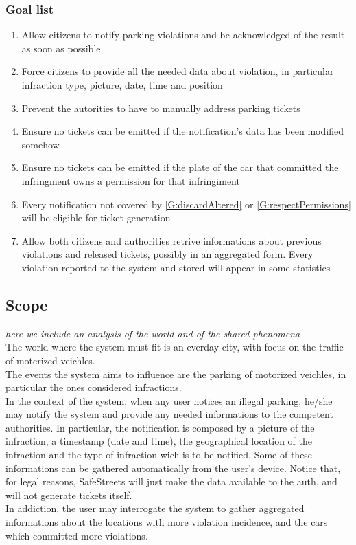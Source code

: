 \documentclass{article}
\newcommand{\enum}[1]{\texttt{#1.\arabic*}}
\begin{document}
		\subsubsection{Goal list}
			\begin{enumerate}[label=\enum{G}]
				\item  \label{G:realTime}Allow citizens to notify parking violations and be acknowledged of the result as soon as possible
				\item \label{G:allData}Force citizens to provide all the needed data about violation, in particular infraction type, picture, date, time and position
				\item \label{G:helpAuth}Prevent the autorities to have to manually address parking tickets
				\item \label{G:discardAltered} Ensure no tickets can be emitted if the notification's data has been modified somehow
				\item \label{G:respectPermissions} Ensure no tickets can be emitted if the plate of the car that committed the infringment owns a permission for that infringiment
				\item \label{G:storeFine} Every notification not covered by \ref{G:discardAltered} or \ref{G:respectPermissions} will be eligible for ticket generation
				\item \label{G:statistics}Allow both citizens and authorities retrive informations about previous violations and released tickets, possibly in an aggregated form. Every violation reported to the system and stored will appear in some statistics
				
			\end{enumerate}

	\subsection{Scope} \textit{here we include an analysis of the world and of the shared phenomena}\\
	The world where the system must fit is an everday city, with focus on the traffic of moterized veichles.\\
	The events the system aims to influence are the parking of motorized veichles,  in particular the ones considered infractions.\\
	In the context of the system, when any user notices an illegal parking, he/she may notify the system and provide any needed informations to the competent authorities. In particular, the notification is composed by a picture of the infraction, a timestamp (date and time), the geographical location of the infraction and the type of infraction wich is to be notified. Some of these informations can be gathered automatically from the user's device. Notice that, for legal reasons, SafeStreets will just make the data available to the auth, and will \underline{not} generate tickets itself. \\
	In addiction, the user may interrogate the system to gather aggregated informations about the locations with more violation incidence, and the cars which committed more violations. 
	
\end{document}
